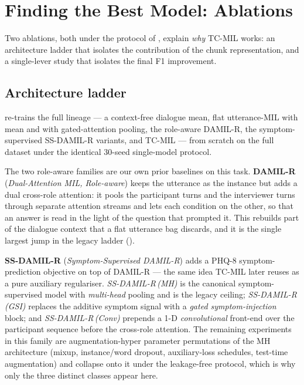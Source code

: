 \documentclass[conference]{IEEEtran}
\begin{document}
\section{Finding the Best Model: Ablations}
\label{sec:ablation}

Two ablations, both under the protocol of , explain
\emph{why} TC-MIL works: an architecture ladder that isolates the contribution
of the chunk representation, and a single-lever study that isolates the final
F1 improvement.

\subsection{Architecture ladder}
 re-trains the full lineage --- a context-free dialogue
mean, flat utterance-MIL with mean and with gated-attention pooling, the
role-aware DAMIL-R, the symptom-supervised SS-DAMIL-R variants, and TC-MIL ---
from scratch on the full dataset under the identical 30-seed single-model
protocol.

The two role-aware families are our own prior baselines on this task. \textbf{DAMIL-R} (\emph{Dual-Attention MIL, Role-aware}) keeps the
utterance as the instance but adds a dual cross-role attention: it pools the
participant turns and the interviewer turns through separate attention streams
and lets each condition on the other, so that an answer is read in the light of
the question that prompted it. This rebuilds part of the dialogue context that
a flat utterance bag discards, and it is the single largest jump in the legacy
ladder ().

\textbf{SS-DAMIL-R} (\emph{Symptom-Supervised
DAMIL-R}) adds a PHQ-8 symptom-prediction objective on top of DAMIL-R --- the
same idea TC-MIL later reuses as a pure auxiliary regulariser. \emph{SS-DAMIL-R\,(MH)} is the canonical symptom-supervised model with \emph{multi-head}
pooling and is the legacy ceiling; \emph{SS-DAMIL-R\,(GSI)} replaces the
additive symptom signal with a \emph{gated symptom-injection} block; and
\emph{SS-DAMIL-R\,(Conv)} prepends a 1-D \emph{convolutional} front-end
over the participant sequence before the cross-role attention. The
remaining experiments in this family are augmentation-hyper\-
parameter permutations of the MH architecture (mixup, instance/word dropout,
auxiliary-loss schedules, test-time augmentation) and collapse onto it under
the leakage-free protocol, which is why only the three distinct classes appear
here.
\end{document}

